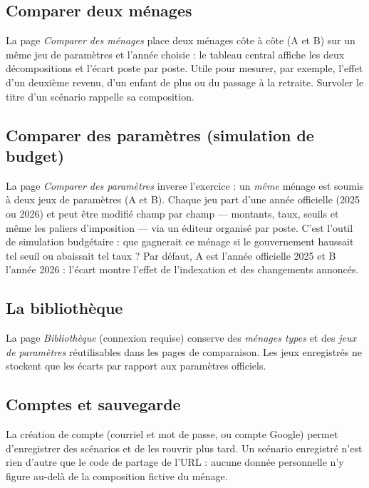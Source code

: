 \subsection{Comparer deux ménages}

La page \emph{Comparer des ménages} place deux ménages côte à côte (A et B)
sur un même jeu de paramètres et l'année choisie : le tableau central affiche
les deux décompositions et l'écart poste par poste. Utile pour mesurer, par
exemple, l'effet d'un deuxième revenu, d'un enfant de plus ou du passage à la
retraite. Survoler le titre d'un scénario rappelle sa composition.

\subsection{Comparer des paramètres (simulation de budget)}

La page \emph{Comparer des paramètres} inverse l'exercice : un \emph{même}
ménage est soumis à deux jeux de paramètres (A et B). Chaque jeu part d'une
année officielle (2025 ou 2026) et peut être modifié champ par champ ---
montants, taux, seuils et même les paliers d'imposition --- via un éditeur
organisé par poste. C'est l'outil de simulation budgétaire : que gagnerait ce
ménage si le gouvernement haussait tel seuil ou abaissait tel taux ? Par
défaut, A est l'année officielle 2025 et B l'année 2026 : l'écart montre
l'effet de l'indexation et des changements annoncés.

\subsection{La bibliothèque}

La page \emph{Bibliothèque} (connexion requise) conserve des \emph{ménages
types} et des \emph{jeux de paramètres} réutilisables dans les pages de
comparaison. Les jeux enregistrés ne stockent que les écarts par rapport aux
paramètres officiels.

\subsection{Comptes et sauvegarde}

La création de compte (courriel et mot de passe, ou compte Google) permet
d'enregistrer des scénarios et de les rouvrir plus tard. Un scénario
enregistré n'est rien d'autre que le code de partage de l'URL : aucune
donnée personnelle n'y figure au-delà de la composition fictive du ménage.

